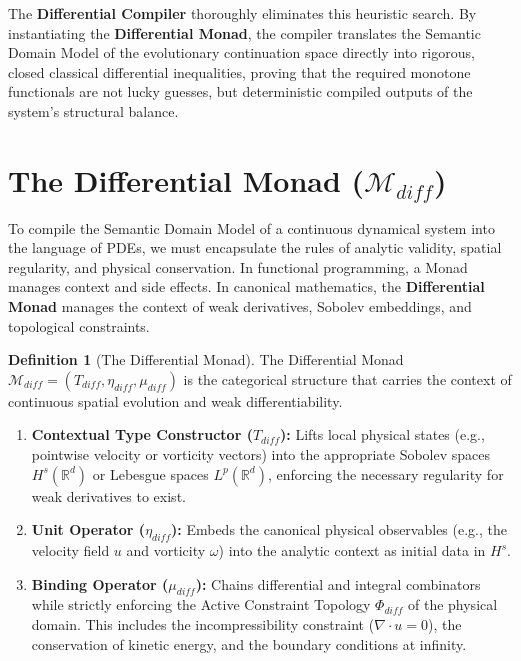 \documentclass[12pt,openany]{extbook}
\theoremstyle{plain}
\theoremstyle{definition}
\newtheorem{definition}{Definition}[chapter]
\begin{document}
The \textbf{Differential Compiler} thoroughly eliminates this heuristic search. By instantiating the \textbf{Differential Monad}, the compiler translates the Semantic Domain Model of the evolutionary continuation space directly into rigorous, closed classical differential inequalities, proving that the required monotone functionals are not lucky guesses, but deterministic compiled outputs of the system's structural balance.

\section{The Differential Monad ($\mathcal{M}_{diff}$)}

To compile the Semantic Domain Model of a continuous dynamical system into the language of PDEs, we must encapsulate the rules of analytic validity, spatial regularity, and physical conservation. In functional programming, a Monad manages context and side effects. In canonical mathematics, the \textbf{Differential Monad} manages the context of weak derivatives, Sobolev embeddings, and topological constraints.

\begin{definition}[The Differential Monad]
The Differential Monad $\mathcal{M}_{diff} = (T_{diff}, \eta_{diff}, \mu_{diff})$ is the categorical structure that carries the context of continuous spatial evolution and weak differentiability.
\begin{enumerate}
    \item \textbf{Contextual Type Constructor ($T_{diff}$):} Lifts local physical states (e.g., pointwise velocity or vorticity vectors) into the appropriate Sobolev spaces $H^s(\mathbb{R}^d)$ or Lebesgue spaces $L^p(\mathbb{R}^d)$, enforcing the necessary regularity for weak derivatives to exist.
    \item \textbf{Unit Operator ($\eta_{diff}$):} Embeds the canonical physical observables (e.g., the velocity field $u$ and vorticity $\omega$) into the analytic context as initial data in $H^s$.
    \item \textbf{Binding Operator ($\mu_{diff}$):} Chains differential and integral combinators while strictly enforcing the Active Constraint Topology $\Phi_{diff}$ of the physical domain. This includes the incompressibility constraint ($\nabla \cdot u = 0$), the conservation of kinetic energy, and the boundary conditions at infinity.
\end{enumerate}
\end{definition}
\end{document}
